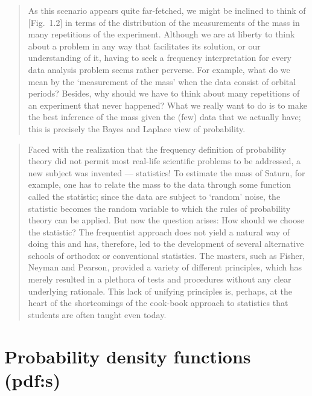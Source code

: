 \documentclass[%
oneside,                 %
final,                   %
10pt]{article}
\begin{document}

\begin{quote}
As this scenario appears quite far-fetched, we might be inclined to think of [Fig.~1.2] in terms of the distribution of the measurements of the mass in many repetitions of the experiment. Although we are at liberty to think about a problem in any way that facilitates its solution, or our understanding of it, having to seek a frequency interpretation for every data analysis problem seems rather perverse.
For example, what do we mean by the ‘measurement of the mass’ when the data consist of orbital periods? Besides, why should we have to think about many repetitions of an experiment that never happened? What we really want to do is to make the best inference of the mass given the (few) data that we actually have; this is precisely the Bayes and Laplace view of probability.
\end{quote}



\begin{quote}
Faced with the realization that the frequency definition of probability theory did not permit most real-life scientific problems to be addressed, a new subject was invented — statistics! To estimate the mass of Saturn, for example, one has to relate the mass to the data through some function called the statistic; since the data are subject to ‘random’ noise, the statistic becomes the random variable to which the rules of probability theory can be applied. But now the question arises: How should we choose the statistic? The frequentist approach does not yield a natural way of doing this and has, therefore, led to the development of several alternative schools of orthodox or conventional statistics. The masters, such as Fisher, Neyman and Pearson, provided a variety of different principles, which has merely resulted in a plethora of tests and procedures without any clear underlying rationale. This lack of unifying principles is, perhaps, at the heart of the shortcomings of the cook-book approach to statistics that students are often taught even today.
\end{quote}


\section{Probability density functions (pdf:s)}
\end{document}

